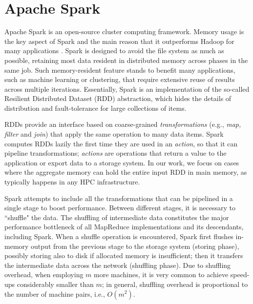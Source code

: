\documentclass[journal]{IEEEtran}
\begin{document}
\section{Apache Spark}
\label{sec:spark}

Apache Spark is an open-source cluster computing framework. Memory usage is the key aspect of Spark and the main reason that it outperforms Hadoop for many applications \cite{zaharia2012}. Spark is designed to avoid the file system as much as possible, retaining most data resident in distributed memory across phases in the same job. Such memory-resident feature stands to benefit many applications, such as machine learning or clustering, that require extensive reuse of results across multiple iterations.
Essentially, Spark is an implementation of the so-called Resilient Distributed Dataset (RDD) abstraction, which hides the details of distribution and fault-tolerance for large collections of items.

RDDs provide an interface based on coarse-grained {\it transformations} (e.g., \emph{map, filter} and \emph{join}) that apply the same operation to many data items. Spark computes RDDs lazily the first time they are used in an {\it action}, so that it can pipeline transformations; {\it actions} are operations that return a value to the application or export data to a storage system.
In our work, we focus on cases where the aggregate memory can hold the entire input RDD in main memory, as typically happens in any HPC infrastructure.

Spark attempts to include all the transformations that can be pipelined in a single stage to boost performance. Between different stages, it is necessary to ``shuffle" the data. The shuffling of intermediate data constitutes the major performance bottleneck of all MapReduce implementations and its descendants, including Spark. When a shuffle operation is encountered, Spark first flushes in-memory output from the previous stage to the storage system (storing phase), possibly storing also to disk if allocated memory is insufficient; then it transfers the intermediate data across the network (shuffling phase). Due to shuffling overhead, when employing $m$ more machines, it is very common to achieve speed-ups considerably smaller than $m$; in general, shuffling overhead is proportional to the number of machine pairs, i.e., $O(m^2)$.
\end{document}
